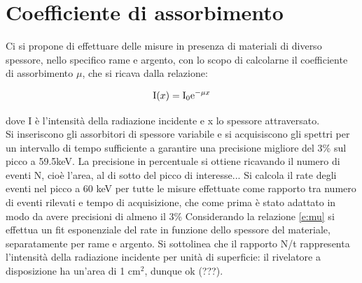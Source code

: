 \documentclass[twocolumn,10pt]{asme2ej}
\begin{document}
\cleardoublepage
\section{Coefficiente di assorbimento}\label{s:attenuazione} 

Ci si propone di effettuare delle misure in presenza di materiali di diverso spessore, nello specifico rame e argento,
con lo scopo di calcolarne il coefficiente di assorbimento $\mu$, che si ricava dalla relazione:

\vspace{-15pt}
\begin{equation}
   \text{I}(x) = \text{I}_0 \text{e}^{-\mu x}
    \vspace{-5pt}
    \label{e:mu}
\end{equation}

dove I è l'intensità della radiazione incidente e x lo spessore attraversato. \\ Si inseriscono gli assorbitori di
spessore variabile e si acquisiscono gli spettri per un intervallo di tempo sufficiente a garantire una precisione
migliore del 3\% sul picco a 59.5keV. La precisione in percentuale si ottiene ricavando il numero di eventi N, cioè
l'area, al di sotto del picco di interesse... Si calcola il rate degli eventi nel picco a 60 keV per tutte le misure
effettuate come rapporto tra numero di eventi rilevati e tempo di acquisizione, che come prima è stato adattato in modo
da avere precisioni di almeno il 3\% Considerando la relazione \autoref{e:mu} si effettua un fit esponenziale del rate
in funzione dello spessore del materiale, separatamente per rame e argento. Si sottolinea che il rapporto N/t
rappresenta l'intensità della radiazione incidente per unità di superficie: il rivelatore a disposizione ha un'area di 1
$\si{\centi\metre}^2$, dunque ok (???).
\end{document}
